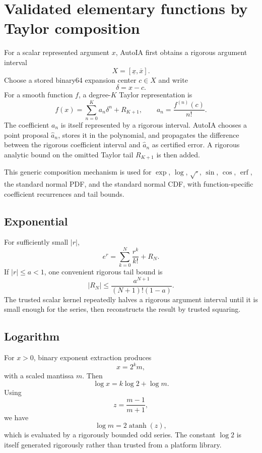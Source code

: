 \documentclass[11pt]{article}
\begin{document}
\section{Validated elementary functions by Taylor composition}

For a scalar represented argument \(x\), AutoIA first obtains a rigorous argument
interval
\[
  X=[\underline x,\overline x].
\]
Choose a stored binary64 expansion center \(c\in X\) and write
\[
  \delta=x-c.
\]
For a smooth function \(f\), a degree-\(K\) Taylor representation is
\[
  f(x)
  =\sum_{n=0}^{K}a_n\delta^n+R_{K+1},
  \qquad
  a_n=\frac{f^{(n)}(c)}{n!}.
\]
The coefficient \(a_n\) is itself represented by a rigorous interval.  AutoIA
chooses a point proposal \(\widehat a_n\), stores it in the polynomial, and
propagates the difference between the rigorous coefficient interval and
\(\widehat a_n\) as certified error.  A rigorous analytic bound on the omitted
Taylor tail \(R_{K+1}\) is then added.

This generic composition mechanism is used for \(\exp\), \(\log\),
\(\sqrt{\cdot}\), \(\sin\), \(\cos\), \(\operatorname{erf}\), the standard normal
PDF, and the standard normal CDF, with function-specific coefficient recurrences
and tail bounds.

\subsection{Exponential}

For sufficiently small \(|r|\),
\[
  e^r=\sum_{k=0}^{N}\frac{r^k}{k!}+R_N.
\]
If \(|r|\le a<1\), one convenient rigorous tail bound is
\[
  |R_N|
  \le
  \frac{a^{N+1}}{(N+1)!(1-a)}.
\]
The trusted scalar kernel repeatedly halves a rigorous argument interval until it
is small enough for the series, then reconstructs the result by trusted squaring.

\subsection{Logarithm}

For \(x>0\), binary exponent extraction produces
\[
  x=2^k m,
\]
with a scaled mantissa \(m\).  Then
\[
  \log x=k\log2+\log m.
\]
Using
\[
  z=\frac{m-1}{m+1},
\]
we have
\[
  \log m=2\operatorname{atanh}(z),
\]
which is evaluated by a rigorously bounded odd series.  The constant \(\log2\)
is itself generated rigorously rather than trusted from a platform library.
\end{document}
